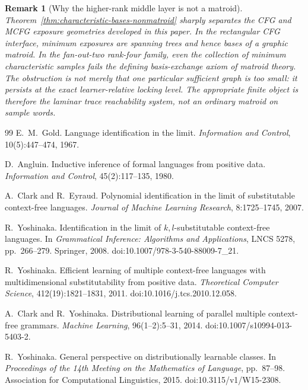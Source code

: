 \documentclass[11pt]{article}
\newtheorem{remark}[definition]{Remark}
\begin{document}
\begin{remark}[Why the higher-rank middle layer is not a matroid]
Theorem~\ref{thm:characteristic-bases-nonmatroid} sharply separates the CFG and
MCFG exposure geometries developed in this paper.  In the rectangular CFG
interface, minimum exposures are spanning trees and hence bases of a graphic
matroid.  In the fan-out-two rank-four family, even the collection of minimum
characteristic samples fails the defining basis-exchange axiom of matroid
theory.  The obstruction is not merely that one particular sufficient graph is
too small: it persists at the exact learner-relative locking level.  The
appropriate finite object is therefore the laminar trace reachability system,
not an ordinary matroid on sample words.
\end{remark}

\begin{thebibliography}{99}
E.~M.~Gold.
Language identification in the limit.
\emph{Information and Control}, 10(5):447--474, 1967.

D.~Angluin.
Inductive inference of formal languages from positive data.
\emph{Information and Control}, 45(2):117--135, 1980.

A.~Clark and R.~Eyraud.
Polynomial identification in the limit of substitutable context-free languages.
\emph{Journal of Machine Learning Research}, 8:1725--1745, 2007.

R.~Yoshinaka.
Identification in the limit of $k,l$-substitutable context-free languages.
In \emph{Grammatical Inference: Algorithms and Applications}, LNCS 5278,
pp.~266--279. Springer, 2008.
doi:10.1007/978-3-540-88009-7\_21.

R.~Yoshinaka.
Efficient learning of multiple context-free languages with multidimensional
substitutability from positive data.
\emph{Theoretical Computer Science}, 412(19):1821--1831, 2011.
doi:10.1016/j.tcs.2010.12.058.

A.~Clark and R.~Yoshinaka.
Distributional learning of parallel multiple context-free grammars.
\emph{Machine Learning}, 96(1--2):5--31, 2014.
doi:10.1007/s10994-013-5403-2.

R.~Yoshinaka.
General perspective on distributionally learnable classes.
In \emph{Proceedings of the 14th Meeting on the Mathematics of Language},
pp.~87--98. Association for Computational Linguistics, 2015.
doi:10.3115/v1/W15-2308.


\end{thebibliography}
\end{document}
